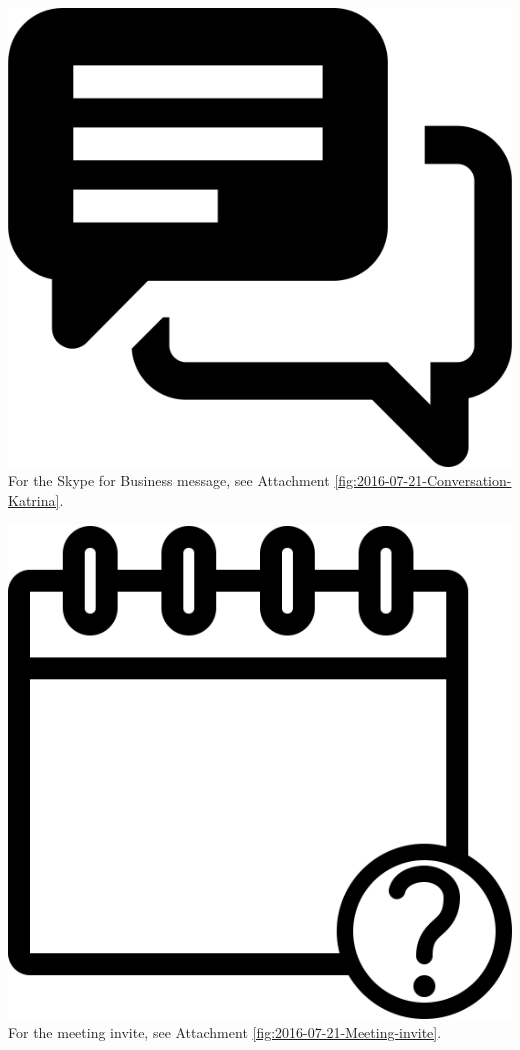 \documentclass{article}
\begin{document}
\vspace{2em}
\noindent\includegraphics[height=\fontcharht\font`\B]{icons/attachment-message} For the Skype for Business message, see Attachment \ref{fig:2016-07-21-Conversation-Katrina}.
\vspace{2em}

\vspace{2em}
\noindent\includegraphics[height=\fontcharht\font`\B]{icons/attachment-calendar} For the meeting invite, see Attachment \ref{fig:2016-07-21-Meeting-invite}.
\vspace{2em}
\end{document}
